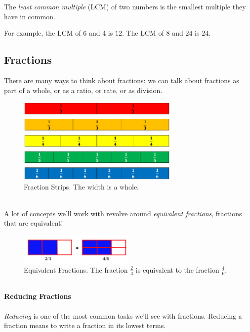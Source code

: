 \begin{definition} 
The \emph{least common multiple} (LCM) of two numbers is the smallest multiple they have in common.  

For example, the LCM of \(6\) and \(4\) is \(12\).  The LCM of \(8\) and \(24\) is \(24\).   
\end{definition}


\newpage 
\subsection{Fractions}
There are many ways to think about fractions: we can talk about fractions as part of a whole, or as a ratio, or rate, or as division.  
\begin{figure}[h!]
    \centering
    \includegraphics[width=0.7\textwidth]{img/FractionStrips.png}  
    \caption{Fraction Strips. The width is a whole.}
    \label{fig:fraction-strips}
\end{figure}
\\
A lot of concepts we'll work with revolve around \emph{equivalent fractions}, fractions that are equivalent!
\begin{figure}[h!]
    \centering
    \includegraphics[width=0.5\textwidth]{img/fraction2-3.png}
    \caption{Equivalent Fractions.  The fraction \(\frac{2}{3}\) is equivalent to the fraction \(\frac{4}{6}\).}
    \label{fig:equivalent-fractions}
\end{figure}
\\ 
\textbf{Reducing Fractions}
\\ \\ 
\emph{Reducing} is one of the most common tasks we'll see with fractions.  Reducing a fraction means to write a fraction in its lowest terms.  




